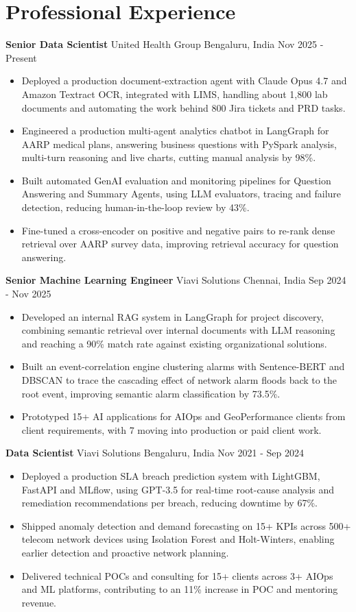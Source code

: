 \documentclass[10pt,a4paper]{article}
\newcommand{\role}[4]{\textbf{#1} \textbar{} #2 \hfill #3 \textbar{} #4\par}
\begin{document}
\section{Professional Experience}
\role{Senior Data Scientist}{United Health Group}{Bengaluru, India}{Nov 2025 - Present}
\begin{itemize}
  \item Deployed a production document-extraction agent with Claude Opus 4.7 and Amazon Textract OCR, integrated with LIMS, handling about 1,800 lab documents and automating the work behind 800 Jira tickets and PRD tasks.
  \item Engineered a production multi-agent analytics chatbot in LangGraph for AARP medical plans, answering business questions with PySpark analysis, multi-turn reasoning and live charts, cutting manual analysis by 98\%.
  \item Built automated GenAI evaluation and monitoring pipelines for Question Answering and Summary Agents, using LLM evaluators, tracing and failure detection, reducing human-in-the-loop review by 43\%.
  \item Fine-tuned a cross-encoder on positive and negative pairs to re-rank dense retrieval over AARP survey data, improving retrieval accuracy for question answering.
\end{itemize}
\vspace{3pt}
\role{Senior Machine Learning Engineer}{Viavi Solutions}{Chennai, India}{Sep 2024 - Nov 2025}
\begin{itemize}
  \item Developed an internal RAG system in LangGraph for project discovery, combining semantic retrieval over internal documents with LLM reasoning and reaching a 90\% match rate against existing organizational solutions.
  \item Built an event-correlation engine clustering alarms with Sentence-BERT and DBSCAN to trace the cascading effect of network alarm floods back to the root event, improving semantic alarm classification by 73.5\%.
  \item Prototyped 15+ AI applications for AIOps and GeoPerformance clients from client requirements, with 7 moving into production or paid client work.
\end{itemize}
\vspace{3pt}
\role{Data Scientist}{Viavi Solutions}{Bengaluru, India}{Nov 2021 - Sep 2024}
\begin{itemize}
  \item Deployed a production SLA breach prediction system with LightGBM, FastAPI and MLflow, using GPT-3.5 for real-time root-cause analysis and remediation recommendations per breach, reducing downtime by 67\%.
  \item Shipped anomaly detection and demand forecasting on 15+ KPIs across 500+ telecom network devices using Isolation Forest and Holt-Winters, enabling earlier detection and proactive network planning.
  \item Delivered technical POCs and consulting for 15+ clients across 3+ AIOps and ML platforms, contributing to an 11\% increase in POC and mentoring revenue.
\end{itemize}
\end{document}
